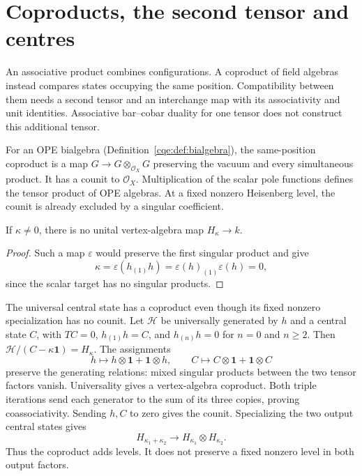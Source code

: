 \section{Coproducts, the second tensor and centres}
\label{e1f:sec:map}

An associative product combines configurations. A coproduct
of field algebras instead compares states occupying the
same position. Compatibility between them needs a second
tensor and an interchange map with its associativity and
unit identities. Associative bar--cobar duality for one
tensor does not construct this additional tensor.

For an OPE bialgebra
(Definition~\ref{cqe:def:bialgebra}), the same-position
coproduct is a map
\(G\to G\otimes_{\mathcal O_X}G\) preserving the vacuum
and every simultaneous product. It has a counit to
\(\mathcal O_X\). Multiplication of the scalar pole
functions defines the tensor product of OPE algebras.
At a fixed nonzero Heisenberg level, the counit is already
excluded by a singular coefficient.

\begin{proposition}\label{e1f:prop:counit}
If \(\kappa\ne0\), there is no unital vertex-algebra map
\(H_\kappa\to k\).
\end{proposition}

\begin{proof}
Such a map \(\varepsilon\) would preserve the first
singular product and give
\[
 \kappa=\varepsilon(h_{(1)}h)
       =\varepsilon(h)_{(1)}\varepsilon(h)=0,
\]
since the scalar target has no singular products.
\end{proof}

The\label{e1f:def:universal-central-current} universal central state has a coproduct even though
its fixed nonzero specialization has no counit. Let
\(\mathcal H\) be universally generated by \(h\) and
a central state \(C\), with \(TC=0\),
\(h_{(1)}h=C\), and \(h_{(n)}h=0\) for \(n=0\)
and \(n\geq2\). Then
\(\mathcal H/(C-\kappa\mathbf1)=H_\kappa\).
The assignments
\[
 h\longmapsto h\otimes\mathbf1+\mathbf1\otimes h,
 \qquad
 C\longmapsto C\otimes\mathbf1+\mathbf1\otimes C
\]
preserve the generating relations: mixed singular products
between the two tensor factors vanish. Universality gives
a vertex-algebra coproduct. Both triple iterations send
each generator to the sum of its three copies, proving
coassociativity. Sending \(h,C\) to zero gives the counit.
Specializing the two output central states gives
\[
 H_{\kappa_1+\kappa_2}\longrightarrow
                         H_{\kappa_1}\otimes H_{\kappa_2}.
\]
Thus the coproduct adds levels. It does not preserve a
fixed nonzero level in both output factors.

